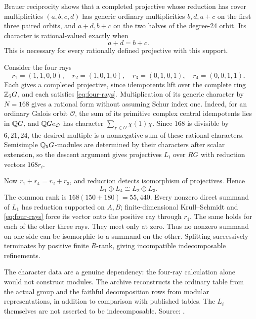 Brauer reciprocity shows that a completed projective
whose reduction has cover multiplicities \((a,b,c,d)\)
has generic ordinary multiplicities \(b,d,a+c\) on
the first three paired orbits, and \(a+d,b+c\) on
the two halves of the degree-24 orbit. Its character
is rational-valued exactly when
\begin{equation}\label{eq:four-rays}
 a+d=b+c.
\end{equation}
This is necessary for every rationally defined
projective with this support.

Consider the four rays
\[
 r_1=(1,1,0,0),\quad r_2=(1,0,1,0),\quad
 r_3=(0,1,0,1),\quad r_4=(0,0,1,1).
\]
Each gives a completed projective, since idempotents
lift over the complete ring \(\mathbb Z_5G\), and each
satisfies \eqref{eq:four-rays}. Multiplication of
its generic character by \(N=168\) gives a rational
form without assuming Schur index one. Indeed, for
an ordinary Galois orbit \(\mathcal O\), the sum
of its primitive complex central idempotents lies
in \(\mathbb Q G\), and \(\mathbb Q Ge_{\mathcal O}\) has character
\(\sum_{\chi\in\mathcal O}\chi(1)\chi\).
Since \(168\) is divisible by \(6,21,24\), the
desired multiple is a nonnegative sum of these
rational characters. Semisimple \(\mathbb Q_5G\)-modules
are determined by their characters after scalar
extension, so the descent argument gives projectives
\(L_i\) over \(RG\) with reduction vectors \(168r_i\).

Now \(r_1+r_4=r_2+r_3\), and reduction detects
isomorphism of projectives. Hence
\[
 L_1\oplus L_4\cong L_2\oplus L_3.
\]
The common rank is \(168(150+180)=55{,}440\).
Every nonzero direct summand of \(L_1\) has reduction
supported on \(A,B\); finite-dimensional
Krull--Schmidt and \eqref{eq:four-rays} force its
vector onto the positive ray through \(r_1\).
The same holds for each of the other three rays.
They meet only at zero. Thus no nonzero summand
on one side can be isomorphic to a summand on
the other. Splitting successively terminates by
positive finite \(R\)-rank, giving incompatible
indecomposable refinements.

The character data are a genuine dependency: the
four-ray calculation alone would not construct
modules. The archive reconstructs the ordinary
table from the actual group and the faithful
decomposition rows from modular representations,
in addition to comparison with published tables.
The \(L_i\) themselves are not asserted to be
indecomposable. Source:
.

